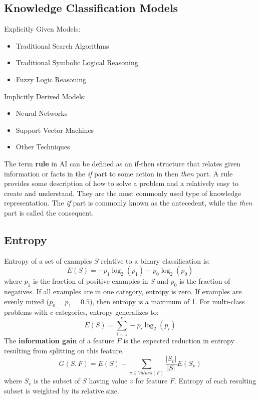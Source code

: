 \documentclass{math}
\begin{document}
\subsection*{Knowledge Classification Models}
Explicitly Given Models:
\begin{itemize}
  \item Traditional Search Algorithms
  \item Traditional Symbolic Logical Reasoning
  \item Fuzzy Logic Reasoning
\end{itemize}
Implicitly Derived Models:
\begin{itemize}
  \item Neural Networks
  \item Support Vector Machines
  \item Other Techniques
\end{itemize}
The term \textbf{rule} in AI can be defined as an if-then structure that relates
given information or facts in the \textit{if} part to some action in then
\textit{then} part. A rule provides some description of how to solve a problem
and a relatively easy to create and understand. They are the most commonly used
type of knowledge representation. The \textit{if} part is commonly known as the
antecedent, while the \textit{then} part is called the consequent.

\subsection*{Entropy}
Entropy of a set of examples \( S \) relative to a binary classification is:
\[ E(S) = -p_1\log_2(p_1)-p_0\log_2(p_0) \]
where \( p_1 \) is the fraction of positive examples in \( S \) and \( p_0 \)
is the fraction of negatives. If all examples are in one category, entropy is
zero. If examples are evenly mixed (\( p_0 = p_1 = 0.5 \)), then entropy is a
maximum of 1. For multi-class problems with \( c \) categories, entropy
generalizes to:
\[ E(S) = \sum_{i=1}^{c}-p_i\log_2(p_i) \]
The \textbf{information gain} of a feature \( F \) is the expected reduction in
entropy resulting from splitting on this feature.
\[ G(S,F) = E(S)-\sum_{v\in Values(F)}\frac{|S_v|}{|S|}E(S_v) \]
where \( S_v \) is the subset of \( S \) having value \( v \) for feature
\( F \). Entropy of each resulting subset is weighted by its relative size.
\end{document}
